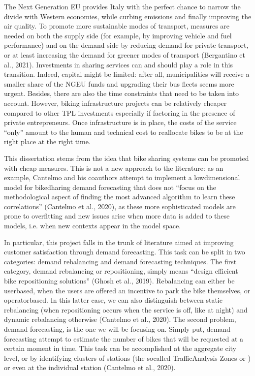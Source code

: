 \documentclass[letterpaper,10pt,english]{jupyterBook}
\begin{document}
\sphinxAtStartPar
The Next Generation EU provides Italy with the perfect chance to narrow the divide with Western economies, while curbing emissions and finally improving the air quality. To promote more sustainable modes of transport, measures are needed on both the supply side (for example, by improving vehicle and fuel performance) and on the demand side by reducing demand for private transport, or at least increasing the demand for greener modes of transport (Bergantino et al., 2021). Investments in sharing services can and should play a role in this transition. Indeed, capital might be limited: after all, municipalities will receive a smaller share of the NGEU funds and upgrading their bus fleets seems more urgent. Besides, there are also the time constraints that need to be taken into account. However, biking infrastructure projects can be relatively cheaper compared to other TPL investments \sphinxhyphen{} especially if factoring in the presence of private entrepreneurs. Once infrastructure is in place, the costs of the service “only” amount to the human and technical cost to reallocate bikes to be at the right place at the right time.

\sphinxAtStartPar
This dissertation stems from the idea that bike sharing systems can be promoted with cheap measures. This is not a new approach to the literature: as an example, Cantelmo and his coauthors attempt to implement a low\sphinxhyphen{}dimensional model for bike\sphinxhyphen{}dharing demand forecasting that does not “focus on the methodological aspect of finding the most advanced algorithm to learn these correlations” (Cantelmo et al., 2020), as these more sophisticated models are prone to overfitting and new issues arise when more data is added to these models, i.e. when new contexts appear in the model space.

\sphinxAtStartPar
In particular, this project falls in the trunk of literature aimed at improving customer satisfaction through demand forecasting. This task can be split in two categories: demand rebalancing and demand forecasting techniques. The first category, demand rebalancing or repositioning, simply means “design efficient bike repositioning solutions” (Ghosh et al., 2019). Rebalancing can either be user\sphinxhyphen{}based, when the users are offered an incentive to park the bike themselves, or operator\sphinxhyphen{}based. In this latter case, we can also distinguish between static rebalancing (when repositioning occurs when the service is off, like at night) and dynamic rebalancing otherwise (Cantelmo et al., 2020). The second problem, demand forecasting, is the one we will be focusing on. Simply put, demand forecasting attempt to estimate the number of bikes that will be requested at a certain moment in time. This task can be accomplished at the aggregate city level, or by identifying clusters of stations (the so\sphinxhyphen{}called Traffic\sphinxhyphen{}Analysis Zones or ) or even at the individual station (Cantelmo et al., 2020).
\end{document}
